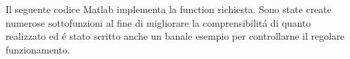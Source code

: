 \begin{center}
\footnotesize\noindent{}\end{center}

\noindent Il seguente codice Matlab implementa la function richiesta. Sono state create numerose sottofunzioni al fine di migliorare la comprensibilit\'a di quanto realizzato ed \'e stato scritto anche un banale esempio per controllarne il regolare funzionamento.



